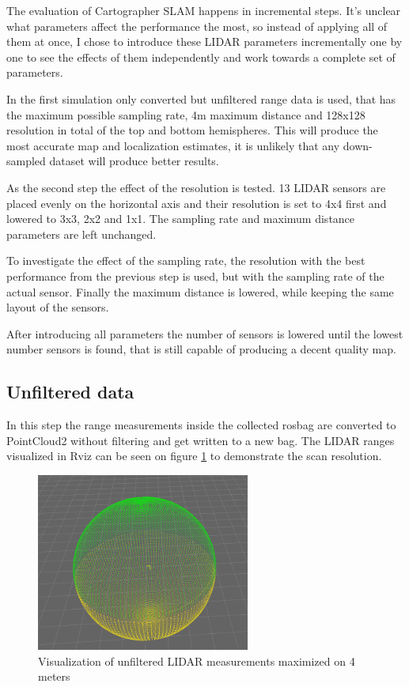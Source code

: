 The evaluation of Cartographer SLAM happens in incremental steps. It's unclear what parameters
affect the performance the most, so instead of applying all of them at once, I chose to introduce
these LIDAR parameters incrementally one by one to see the effects of them independently 
and work towards a complete set of parameters. 

In the first simulation only converted but unfiltered range data is used, that has the 
maximum possible sampling rate, 4m maximum distance and 128x128 resolution in total of 
the top and bottom hemispheres. This will produce the most accurate map and localization 
estimates, it is unlikely that any down-sampled dataset will produce better results.

As the second step the effect of the resolution is tested. 13 LIDAR sensors are placed
evenly on the horizontal axis and their resolution is set to 4x4 first and lowered to 3x3,
2x2 and 1x1. The sampling rate and maximum distance parameters are left unchanged.

To investigate the effect of the sampling rate, the resolution with the best performance 
from the previous step is used, but with the sampling rate of the actual sensor. Finally
the maximum distance is lowered, while keeping the same layout of the sensors.

After introducing all parameters the number of sensors is lowered until the lowest number 
sensors is found, that is still capable of producing a decent quality map.


\subsection{Unfiltered data}
In this step the range measurements inside the collected rosbag are converted to PointCloud2 
without filtering and get written to a new bag. The LIDAR ranges visualized in 
Rviz can be seen on figure \ref{fig:01_maxed_lidar} to demonstrate the scan resolution. 

\begin{figure}[!h]
    \centering
	\includegraphics[width=70mm, keepaspectratio]{figures/01_maxed_lidar.png}
    \caption{Visualization of unfiltered LIDAR measurements maximized on 4 meters}
    \label{fig:01_maxed_lidar}
\end{figure}

